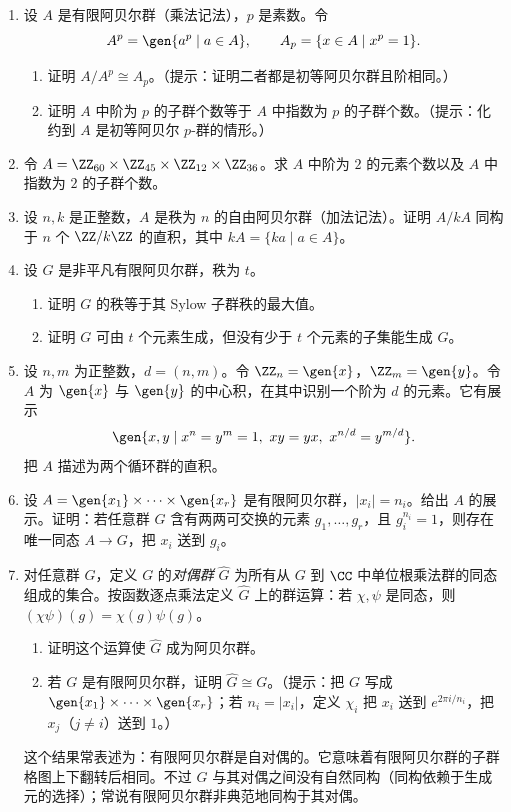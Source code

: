 \begin{enumerate}[label=\arabic*.]
  \item 设 $A$ 是有限阿贝尔群（乘法记法），$p$ 是素数。令
  \[
    A^p=\gen{a^p\mid a\in A},
    \qquad A_p=\{x\in A\mid x^p=1\}.
  \]
  \begin{enumerate}[label=(\alph*)]
    \item 证明 $A/A^p\cong A_p$。（提示：证明二者都是初等阿贝尔群且阶相同。）
    \item 证明 $A$ 中阶为 $p$ 的子群个数等于 $A$ 中指数为 $p$ 的子群个数。（提示：化约到 $A$ 是初等阿贝尔 $p$-群的情形。）
  \end{enumerate}

  \item 令 $A=\ZZ_{60}\times\ZZ_{45}\times\ZZ_{12}\times\ZZ_{36}$。求 $A$ 中阶为 $2$ 的元素个数以及 $A$ 中指数为 $2$ 的子群个数。

  \item 设 $n,k$ 是正整数，$A$ 是秩为 $n$ 的自由阿贝尔群（加法记法）。证明 $A/kA$ 同构于 $n$ 个 $\ZZ/k\ZZ$ 的直积，其中 $kA=\{ka\mid a\in A\}$。

  \item 设 $G$ 是非平凡有限阿贝尔群，秩为 $t$。
  \begin{enumerate}[label=(\alph*)]
    \item 证明 $G$ 的秩等于其 Sylow 子群秩的最大值。
    \item 证明 $G$ 可由 $t$ 个元素生成，但没有少于 $t$ 个元素的子集能生成 $G$。
  \end{enumerate}

  \item 设 $n,m$ 为正整数，$d=(n,m)$。令 $\ZZ_n=\gen{x}$，$\ZZ_m=\gen{y}$。令 $A$ 为 $\gen{x}$ 与 $\gen{y}$ 的中心积，在其中识别一个阶为 $d$ 的元素。它有展示
  \[
    \gen{x,y\mid x^n=y^m=1,
\ xy=yx,
\ x^{n/d}=y^{m/d}}.
  \]
  把 $A$ 描述为两个循环群的直积。

  \item 设 $A=\gen{x_1}\times\cdots\times\gen{x_r}$ 是有限阿贝尔群，$|x_i|=n_i$。给出 $A$ 的展示。证明：若任意群 $G$ 含有两两可交换的元素 $g_1,
\ldots,g_r$，且 $g_i^{n_i}=1$，则存在唯一同态 $A\to G$，把 $x_i$ 送到 $g_i$。

  \item 对任意群 $G$，定义 $G$ 的\emph{对偶群} $\widehat G$ 为所有从 $G$ 到 $\CC$ 中单位根乘法群的同态组成的集合。按函数逐点乘法定义 $\widehat G$ 上的群运算：若 $\chi,\psi$ 是同态，则 $(\chi\psi)(g)=\chi(g)\psi(g)$。
  \begin{enumerate}[label=(\alph*)]
    \item 证明这个运算使 $\widehat G$ 成为阿贝尔群。
    \item 若 $G$ 是有限阿贝尔群，证明 $\widehat G\cong G$。（提示：把 $G$ 写成 $\gen{x_1}\times\cdots\times\gen{x_r}$；若 $n_i=|x_i|$，定义 $\chi_i$ 把 $x_i$ 送到 $e^{2\pi i/n_i}$，把 $x_j$（$j\neq i$）送到 $1$。）
  \end{enumerate}
  这个结果常表述为：有限阿贝尔群是自对偶的。它意味着有限阿贝尔群的子群格图上下翻转后相同。不过 $G$ 与其对偶之间没有自然同构（同构依赖于生成元的选择）；常说有限阿贝尔群非典范地同构于其对偶。


\end{enumerate}
